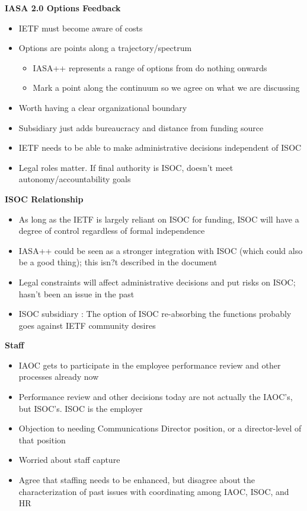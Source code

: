 \documentclass[helvetica]{seminar}
\newcommand{\heading}[1]{%
  \begin{center} 
    \large\bf 
    #1 
  \end{center} 
  \vspace{.4 in}}
\begin{document}
\begin{slide}

\heading{IASA 2.0 Options Feedback}
{\footnotesize
\begin{itemize}
\item IETF must become aware of costs
\item Options are points along a trajectory/spectrum
\begin{itemize}
\item IASA++ represents a range of options from do nothing onwards
\item Mark a point along the continuum so we agree on what we are discussing
\end{itemize}
\item Worth having a clear organizational boundary
\item Subsidiary just adds bureaucracy and distance from funding source
\item IETF needs to be able to make administrative decisions independent of ISOC
\item Legal roles matter. If final authority is ISOC, doesn't meet autonomy/accountability goals 
\end{itemize}
}
\end{slide}

\begin{slide}

\heading{ISOC Relationship}
\begin{itemize}
\item As long as the IETF is largely reliant on ISOC for funding, ISOC will have a degree of control regardless of formal independence
\item IASA++ could be seen as a stronger integration with ISOC (which could also be a good thing); this isn?t described in the document
\item Legal constraints will affect administrative decisions and put risks on ISOC; hasn't been an issue in the past
\item ISOC subsidiary : The option of ISOC re-absorbing the functions probably goes against IETF community desires
\end{itemize}
\end{slide}

\begin{slide}
\heading{Staff}
\begin{itemize}
\item IAOC gets to participate in the employee performance review and other processes already now
\item Performance review and other decisions today are not actually the IAOC's, but ISOC's.  ISOC is the employer
\item Objection to needing Communications Director position, or a director-level of that position
\item Worried about staff capture
\item Agree that staffing needs to be enhanced, but disagree about the characterization of past issues with coordinating among IAOC, ISOC, and HR
\end{itemize}
\end{slide}
\end{document}

